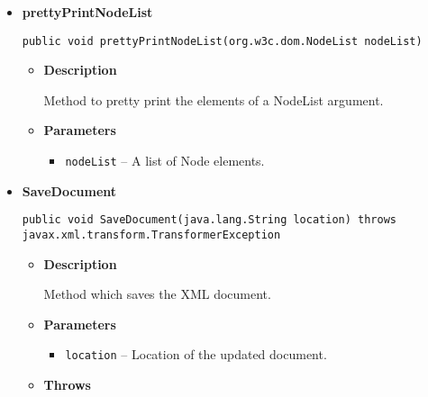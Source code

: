 \documentclass[11pt,a4paper]{report}
\begin{document}
{{{{{{\begin{itemize}
{\begin{itemize}
{Method to pretty print a Node element.
}
\item{
{\bf  Parameters}
  \begin{itemize}
   \item{
\texttt{node} -- Node element to be printed.}
  \end{itemize}
}%
\end{itemize}
}%
\item{ 
\hypertarget{core.Interactor.prettyPrintNodeList(org.w3c.dom.NodeList)}{{\bf  prettyPrintNodeList}\\}
\begin{lstlisting}[frame=none]
public void prettyPrintNodeList(org.w3c.dom.NodeList nodeList)\end{lstlisting} %
\begin{itemize}
\item{
{\bf  Description}

Method to pretty print the elements of a NodeList argument.
}
\item{
{\bf  Parameters}
  \begin{itemize}
   \item{
\texttt{nodeList} -- A list of Node elements.}
  \end{itemize}
}%
\end{itemize}
}%
\item{ 
\hypertarget{core.Interactor.SaveDocument(java.lang.String)}{{\bf  SaveDocument}\\}
\begin{lstlisting}[frame=none]
public void SaveDocument(java.lang.String location) throws javax.xml.transform.TransformerException\end{lstlisting} %
\begin{itemize}
\item{
{\bf  Description}

Method which saves the XML document.
}
\item{
{\bf  Parameters}
  \begin{itemize}
   \item{
\texttt{location} -- Location of the updated document.}
  \end{itemize}
}%
\item{{\bf  Throws}
}%
\end{itemize}
}%
\end{itemize}
}
}
}}}}
\end{document}
